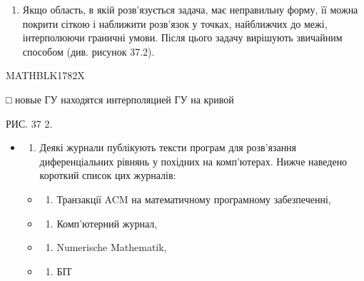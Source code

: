 \documentclass[
  ukrainian,
]{article}
\providecommand{\tightlist}{%
  \setlength{\itemsep}{0pt}\setlength{\parskip}{0pt}}
\begin{document}
\begin{enumerate}
\def\labelenumi{\arabic{enumi}.}
\setcounter{enumi}{5}
\tightlist
\item
  Якщо область, в якій розв'язується задача, має неправильну форму, її
  можна покрити сіткою і наближити розв'язок у точках, найближчих до
  межі, інтерполюючи граничні умови. Після цього задачу вирішують
  звичайним способом (див. рисунок 37.2).
\end{enumerate}

MATHBLK1782X

□ новые ГУ находятся интерполяцией ГУ на кривой

РИС. 37 2.

\begin{itemize}
\item
  \begin{enumerate}
  \def\labelenumi{\arabic{enumi}.}
  \setcounter{enumi}{6}
  \tightlist
  \item
    Деякі журнали публікують тексти програм для розв'язання
    диференціальних рівнянь у похідних на комп'ютерах. Нижче наведено
    короткий список цих журналів:
  \end{enumerate}

  \begin{itemize}
  \tightlist
  \item
    \begin{enumerate}
    \def\labelenumi{\alph{enumi})}
    \tightlist
    \item
      Транзакції ACM на математичному програмному забезпеченні,
    \end{enumerate}
  \item
    \begin{enumerate}
    \def\labelenumi{\arabic{enumi})}
    \setcounter{enumi}{5}
    \tightlist
    \item
      Комп'ютерний журнал,
    \end{enumerate}
  \item
    \begin{enumerate}
    \def\labelenumi{\Alph{enumi})}
    \setcounter{enumi}{1}
    \tightlist
    \item
      Numerische Mathematik,
    \end{enumerate}
  \item
    \begin{enumerate}
    \def\labelenumi{\alph{enumi})}
    \setcounter{enumi}{17}
    \tightlist
    \item
      БІТ
    \end{enumerate}
  \end{itemize}
\end{itemize}
\end{document}
